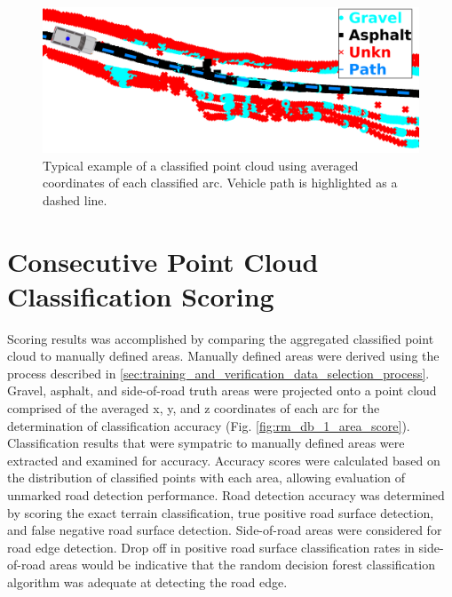 \documentclass[numbered,pdftex]{ohio-etd}
\begin{document}
{{		\begin{figure}[H]
			\centering
			\includegraphics[width=0.9\linewidth]{Defense_Images/db_1_avg_points_example_withvan}
			\caption[Classified Point Cloud]{Typical example of a classified point cloud using averaged coordinates of each classified arc. Vehicle path is highlighted as a dashed line.}
			\label{fig:raw_classification_results}
		\end{figure}
		
	}
	
	\section{Consecutive Point Cloud Classification Scoring}\label{sec:consecutive_point_cloud_classification_scoring}{
		
		{Scoring results was accomplished by comparing the aggregated classified point cloud to manually defined areas. Manually defined areas were derived using the process described in \ref{sec:training_and_verification_data_selection_process}. Gravel, asphalt, and side-of-road truth areas were projected onto a point cloud comprised of the averaged x, y, and z coordinates of each arc for the determination of classification accuracy (Fig. \ref{fig:rm_db_1_area_score}). Classification results that were sympatric to manually defined areas were extracted and examined for accuracy. Accuracy scores were calculated based on the distribution of classified points with each area, allowing evaluation of unmarked road detection performance. Road detection accuracy was determined by scoring the exact terrain classification, true positive road surface detection, and false negative road surface detection. Side-of-road areas were considered for road edge detection. Drop off in positive road surface classification rates in side-of-road areas would be indicative that the random decision forest classification algorithm was adequate at detecting the road edge.}
		

}}
\end{document}
